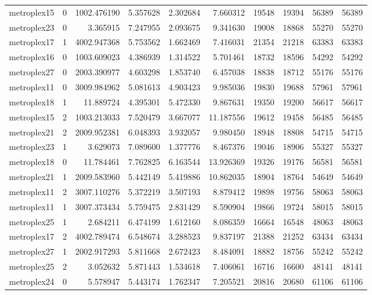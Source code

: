 \begin{longtable}{|l|r|r|r|r|r|r|r|r|r|}
metroplex15 & 0 & 1002.476190 & 5.357628 & 2.302684 & 7.660312 & 19548 & 19394 & 56389 & 56389 \\
metroplex23 & 0 & 3.365915 & 7.247955 & 2.093675 & 9.341630 & 19008 & 18868 & 55270 & 55270 \\
metroplex17 & 1 & 4002.947368 & 5.753562 & 1.662469 & 7.416031 & 21354 & 21218 & 63383 & 63383 \\
metroplex16 & 0 & 1003.609023 & 4.386939 & 1.314522 & 5.701461 & 18732 & 18596 & 54292 & 54292 \\
metroplex27 & 0 & 2003.390977 & 4.603298 & 1.853740 & 6.457038 & 18838 & 18712 & 55176 & 55176 \\
metroplex11 & 0 & 3009.984962 & 5.081613 & 4.903423 & 9.985036 & 19830 & 19688 & 57961 & 57961 \\
metroplex18 & 1 & 11.889724 & 4.395301 & 5.472330 & 9.867631 & 19350 & 19200 & 56617 & 56617 \\
metroplex15 & 2 & 1003.213033 & 7.520479 & 3.667077 & 11.187556 & 19612 & 19458 & 56485 & 56485 \\
metroplex21 & 2 & 2009.952381 & 6.048393 & 3.932057 & 9.980450 & 18948 & 18808 & 54715 & 54715 \\
metroplex23 & 1 & 3.629073 & 7.089600 & 1.377776 & 8.467376 & 19046 & 18906 & 55327 & 55327 \\
metroplex18 & 0 & 11.784461 & 7.762825 & 6.163544 & 13.926369 & 19326 & 19176 & 56581 & 56581 \\
metroplex21 & 1 & 2009.583960 & 5.442149 & 5.419886 & 10.862035 & 18904 & 18764 & 54649 & 54649 \\
metroplex11 & 2 & 3007.110276 & 5.372219 & 3.507193 & 8.879412 & 19898 & 19756 & 58063 & 58063 \\
metroplex11 & 1 & 3007.373434 & 5.759475 & 2.831429 & 8.590904 & 19866 & 19724 & 58015 & 58015 \\
metroplex25 & 1 & 2.684211 & 6.474199 & 1.612160 & 8.086359 & 16664 & 16548 & 48063 & 48063 \\
metroplex17 & 2 & 4002.789474 & 6.548674 & 3.288523 & 9.837197 & 21388 & 21252 & 63434 & 63434 \\
metroplex27 & 1 & 2002.917293 & 5.811668 & 2.672423 & 8.484091 & 18882 & 18756 & 55242 & 55242 \\
metroplex25 & 2 & 3.052632 & 5.871443 & 1.534618 & 7.406061 & 16716 & 16600 & 48141 & 48141 \\
metroplex24 & 0 & 5.578947 & 5.443174 & 1.762347 & 7.205521 & 20816 & 20680 & 61106 & 61106 \\

\end{longtable}
